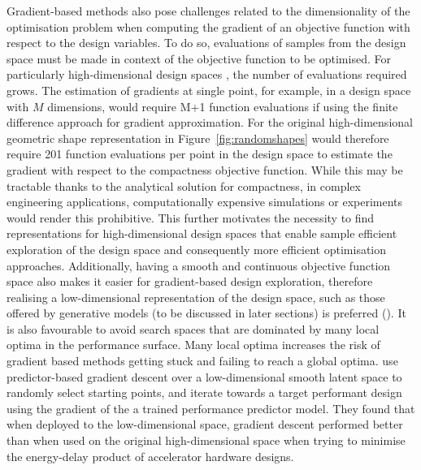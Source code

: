 \documentclass{article}
\begin{document}
Gradient-based methods also pose challenges related to the dimensionality of the optimisation problem when computing the gradient of an objective function with respect to the design variables. To do so, evaluations of samples from the design space must be made in context of the objective function to be optimised. For particularly high-dimensional design spaces \citep{Serani2024}, the number of evaluations required grows. The estimation of gradients at single point, for example, in a design space with $M$ dimensions, would require M+1 function evaluations if using the finite difference approach for gradient approximation. For the original high-dimensional geometric shape representation in Figure~\ref{fig:randomshapes} would therefore require 201 function evaluations per point in the design space to estimate the gradient with respect to the compactness objective function. While this may be tractable thanks to the analytical solution for compactness, in complex engineering applications, computationally expensive simulations or experiments would render this prohibitive. This further motivates the necessity to find representations for high-dimensional design spaces that enable  sample efficient exploration of the design space and consequently more efficient optimisation approaches. Additionally, having a smooth and continuous objective function space also makes it easier for gradient-based design exploration, therefore realising a low-dimensional representation of the design space, such as those offered by generative models (to be discussed in later sections) is preferred (\cite{bottou2010large}). It is also favourable to avoid search spaces that are dominated by many  local optima in the performance surface. Many local optima increases the risk of gradient based methods getting stuck and failing to reach a global optima. \citep{Huang2022} use predictor-based gradient descent over a low-dimensional smooth latent space to randomly select starting points, and iterate towards a target performant design using the gradient of the a trained performance predictor model. They found that when deployed to the low-dimensional space, gradient descent performed better than when used on the original high-dimensional space when trying to minimise the energy-delay product of accelerator hardware designs.
\end{document}
